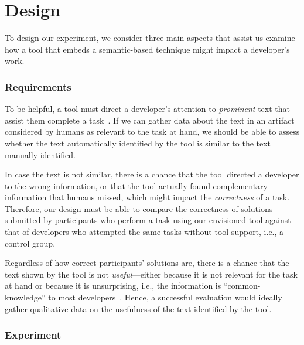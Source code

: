 
\section{Design}
\label{cp6:design}




To design our experiment, we consider three main aspects that assist us examine how a tool that embeds a semantic-based technique might impact a developer's work.



\subsubsection{Requirements}



To be helpful, a tool must direct a developer's attention to \textit{prominent} text that assist them complete a task~\cite{Robillard2015}. If we can gather data about the text in an artifact considered by humans as relevant to the task at hand, we should be able to assess whether the text automatically identified by the tool is similar to the text manually identified. 


In case the text is not similar,
there is a chance that the tool directed a developer to the wrong information, or that 
the tool actually found complementary information that humans missed, which might impact the \textit{correctness} of a task. Therefore, our design must be able to compare the correctness of solutions submitted by participants who perform a task using our envisioned tool against that of developers who attempted the same tasks without tool support, i.e., a control group.


Regardless of how correct participants' solutions are, there is a chance that the text shown by the tool is not \textit{useful}---either because it is not relevant for the task at hand or because it is unsurprising, i.e., the information is ``common-knowledge'' to most developers~\cite{cwalina2008, Robillard2015}. Hence, a successful evaluation would 
ideally
gather qualitative data on the usefulness of the text identified by the tool. 



\subsubsection{Experiment}




